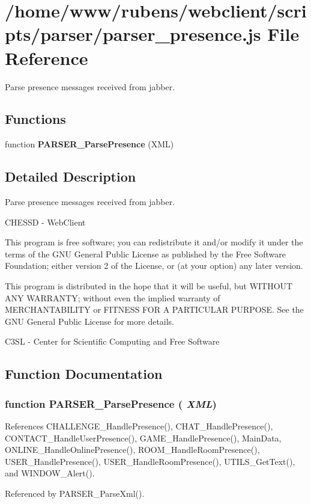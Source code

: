 \section{/home/www/rubens/webclient/scripts/parser/parser\_\-presence.js File Reference}
\label{parser__presence_8js}
Parse presence messages received from jabber. 

\subsection*{Functions}
\begin{CompactItemize}
\item 
function {\bf PARSER\_\-ParsePresence} (XML)
\end{CompactItemize}


\subsection{Detailed Description}
Parse presence messages received from jabber. 

CHESSD - WebClient

This program is free software; you can redistribute it and/or modify it under the terms of the GNU General Public License as published by the Free Software Foundation; either version 2 of the License, or (at your option) any later version.

This program is distributed in the hope that it will be useful, but WITHOUT ANY WARRANTY; without even the implied warranty of MERCHANTABILITY or FITNESS FOR A PARTICULAR PURPOSE. See the GNU General Public License for more details.

C3SL - Center for Scientific Computing and Free Software 

\subsection{Function Documentation}
\subsubsection[PARSER\_\-ParsePresence]{\setlength{\rightskip}{0pt plus 5cm}function PARSER\_\-ParsePresence ( {\em XML})}\label{parser__presence_8js_a30203f0ae187eaddbcc60b04bc1a1ff}




References CHALLENGE\_\-HandlePresence(), CHAT\_\-HandlePresence(), CONTACT\_\-HandleUserPresence(), GAME\_\-HandlePresence(), MainData, ONLINE\_\-HandleOnlinePresence(), ROOM\_\-HandleRoomPresence(), USER\_\-HandlePresence(), USER\_\-HandleRoomPresence(), UTILS\_\-GetText(), and WINDOW\_\-Alert().

Referenced by PARSER\_\-ParseXml().